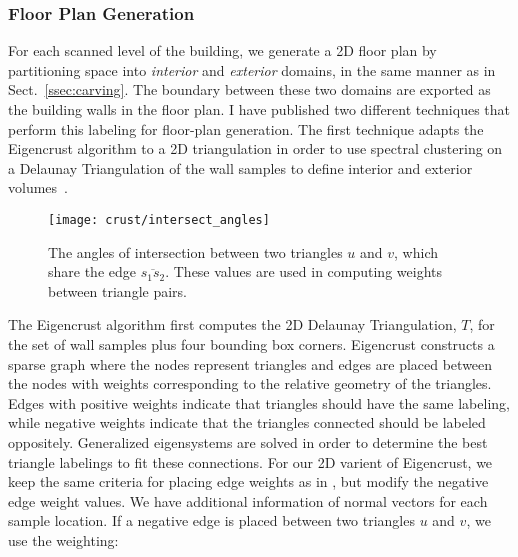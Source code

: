 \documentclass[journal]{IEEEtran}
\begin{document}
\subsubsection{Floor Plan Generation}
\label{sssec:floorplan}
For each scanned level of the building, we generate a 2D floor plan by partitioning space into \textit{interior} and \textit{exterior} domains, in the same manner as in Sect.~\ref{ssec:carving}.  The boundary between these two domains are exported as the building walls in the floor plan.  I have published two different techniques that perform this labeling for floor-plan generation.  The first technique adapts the Eigencrust algorithm to a 2D triangulation in order to use spectral clustering on a Delaunay Triangulation of the wall samples to define interior and exterior volumes~\cite{Eigencrust,EigencrustShewchuk}.


\begin{figure}[t]

\begin{minipage}[b]{1.0\linewidth}
  \centering
  \centerline{\texttt{[image: crust/intersect\_angles]}}
\end{minipage}

\caption{The angles of intersection between two triangles $u$ and $v$, which share the edge $\overline{s_1 s_2}$. These values are used in computing weights between triangle pairs.}
\label{fig:intersect_angles}

\end{figure}

The Eigencrust algorithm first computes the 2D Delaunay Triangulation, $T$, for the set of wall samples plus four bounding box corners.  Eigencrust constructs a sparse graph where the nodes represent triangles and edges are placed between the nodes with weights corresponding to the relative geometry of the triangles.  Edges with positive weights indicate that triangles should have the same labeling, while negative weights indicate that the triangles connected should be labeled oppositely.  Generalized eigensystems are solved in order to determine the best triangle labelings to fit these connections.  For our 2D varient of Eigencrust, we keep the same criteria for placing edge weights as in \cite{EigencrustShewchuk}, but modify the negative edge weight values.  We have additional information of normal vectors for each sample location. If a negative edge is placed between two triangles $u$ and $v$, we use the weighting:
\end{document}
